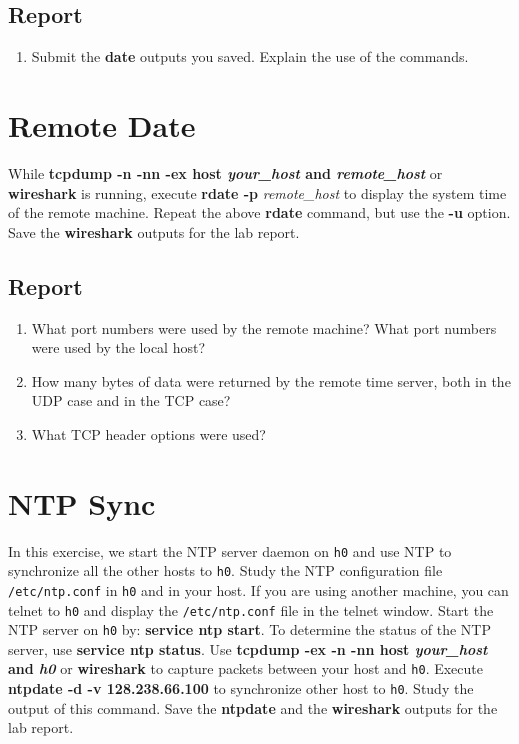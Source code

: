 \documentclass{../UTNetLab}
\begin{document}
    \subsection*{Report}
    \begin{enumerate}
        \item Submit the \textbf{date} outputs you saved.
        Explain the use of the commands.
    \end{enumerate}

\section{Remote Date}
    While \textbf{tcpdump -n -nn -ex host \textit{your\_host} and \textit{remote\_host}} or \textbf{wireshark} is running, execute \textbf{rdate -p} \textit{remote\_host} to display the system time of the remote machine.
    Repeat the above \textbf{rdate} command, but use the \textbf{-u} option.
    Save the \textbf{wireshark} outputs for the lab report.

    \subsection*{Report}
    \begin{enumerate}
        \item What port numbers were used by the remote machine?
        What port numbers were used by the local host?
        \item How many bytes of data were returned by the remote time server, both in the UDP case and in the TCP case?
        \item What TCP header options were used?
    \end{enumerate}

\section{NTP Sync}
    In this exercise, we start the NTP server daemon on \texttt{h0} and use NTP to
    synchronize all the other hosts to \texttt{h0}.
    Study the NTP configuration file \texttt{/etc/ntp.conf} in \texttt{h0} and in your host.
    If you are using another machine, you can telnet to \texttt{h0} and display the \texttt{/etc/ntp.conf} file in the telnet window.
    Start the NTP server on \texttt{h0} by: \textbf{service ntp start}.
    To determine the status of the NTP server, use \textbf{service ntp status}.
    Use \textbf{tcpdump -ex -n -nn host \textit{your\_host} and \textit{h0}} or \textbf{wireshark} to capture packets between your host and \texttt{h0}.
    Execute \textbf{ntpdate -d -v 128.238.66.100} to synchronize other host to \texttt{h0}.
    Study the output of this command.
    Save the \textbf{ntpdate} and the \textbf{wireshark} outputs for the lab report.
\end{document}
